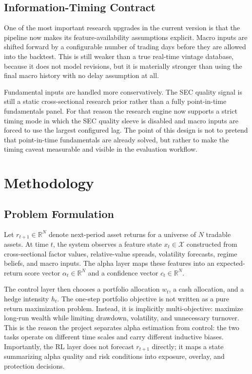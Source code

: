 \documentclass[11pt]{article}
\begin{document}
\subsection{Information-Timing Contract}

One of the most important research upgrades in the current version is that the
pipeline now makes its feature-availability assumptions explicit. Macro inputs
are shifted forward by a configurable number of trading days before they are
allowed into the backtest. This is still weaker than a true real-time vintage
database, because it does not model revisions, but it is materially stronger
than using the final macro history with no delay assumption at all.

Fundamental inputs are handled more conservatively. The SEC quality signal is
still a static cross-sectional research prior rather than a fully point-in-time
fundamentals panel. For that reason the research engine now supports a strict
timing mode in which the SEC quality sleeve is disabled and macro inputs are
forced to use the largest configured lag. The point of this design is not to
pretend that point-in-time fundamentals are already solved, but rather to make
the timing caveat measurable and visible in the evaluation workflow.

\section{Methodology}

\subsection{Problem Formulation}

Let $r_{t+1} \in \mathbb{R}^N$ denote next-period asset returns for a universe of
$N$ tradable assets. At time $t$, the system observes a feature state
$x_t \in \mathcal{X}$ constructed from cross-sectional factor values,
relative-value spreads, volatility forecasts, regime beliefs, and macro inputs.
The alpha layer maps these features into an expected-return score vector
$\alpha_t \in \mathbb{R}^N$ and a confidence vector $c_t \in \mathbb{R}^N$.

The control layer then chooses a portfolio allocation $w_t$, a cash allocation,
and a hedge intensity $h_t$. The one-step portfolio objective is not written as
a pure return maximization problem. Instead, it is implicitly multi-objective:
maximize long-run wealth while limiting drawdown, volatility, and unnecessary
turnover. This is the reason the project separates alpha estimation from control:
the two tasks operate on different time scales and carry different inductive
biases.
Importantly, the RL layer does not forecast $r_{t+1}$ directly; it maps a state
summarizing alpha quality and risk conditions into exposure, overlay, and
protection decisions.
\end{document}
